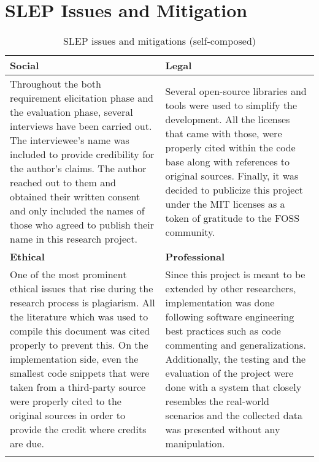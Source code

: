 \section{SLEP Issues and Mitigation}\label{sec:slep}



\begin{longtable}{|p{78mm}|p{78mm}|}
    \hline

    \textbf{Social} & \textbf{Legal} \\ \hline
    Throughout the both requirement elicitation phase and the evaluation phase, several interviews have been carried out. The interviewee's name was included to provide credibility for the author's claims. The author reached out to them and obtained their written consent and only included the names of those who agreed to publish their name in this research project. & Several open-source libraries and tools were used to simplify the development. All the licenses that came with those, were properly cited within the code base along with references to original sources. Finally, it was decided to publicize this project under the MIT licenses as a token of gratitude to the FOSS community. \\ \hline

    \textbf{Ethical} & \textbf{Professional} \\ \hline

One of the most prominent ethical issues that rise during the research process is plagiarism.  All the literature which was used to compile this document was cited properly to prevent this. On the implementation side, even the smallest code snippets that were taken from a third-party source were properly cited to the original sources in order to provide the credit where credits are due. & Since this project is meant to be extended by other researchers, implementation was done following software engineering best practices such as code commenting and generalizations. Additionally, the testing and the evaluation of the project were done with a system that closely resembles the real-world scenarios and the collected data was presented without any manipulation. \\ \hline

    \caption{SLEP issues and mitigations (self-composed)}
\end{longtable}

